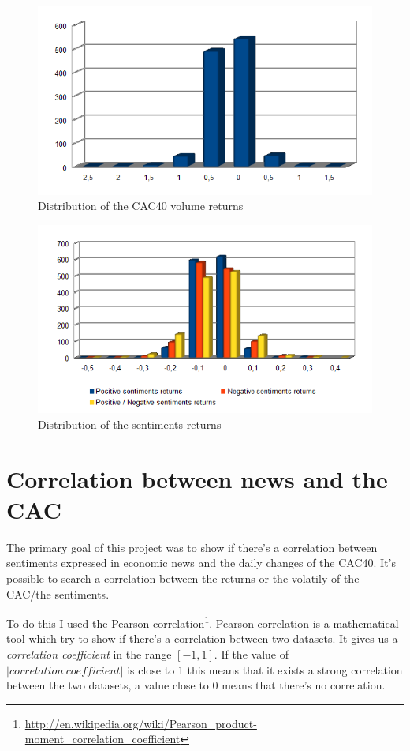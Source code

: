 \documentclass[12pt]{report}
\begin{document}
			\begin{figure}[H]
				\caption{Distribution of the CAC40 volume returns\label{dist_vol}}
				\includegraphics{plots/dists/volume_return.png}
			\end{figure}

			\begin{figure}[H]
				\caption{Distribution of the sentiments returns\label{dist_sentiments}}
				\includegraphics{plots/dists/pos_neg_posneg_returns_dist.png}
			\end{figure}
			
		\section{Correlation between news and the CAC}

			The primary goal of this project was to show if there's a correlation between sentiments expressed in economic news and the daily changes of the CAC40. It's possible to search a correlation between the returns or the volatily of the CAC/the sentiments.
			
			To do this I used the Pearson correlation\footnote{\url{http://en.wikipedia.org/wiki/Pearson_product-moment_correlation_coefficient}}. Pearson correlation is a mathematical tool which try to show if there's a correlation between two datasets. It gives us a \emph{correlation coefficient} in the range $[-1, 1]$. If the value of $|correlation\ coefficient|$ is close to 1 this means that it exists a strong correlation between the two datasets, a value close to 0 means that there's no correlation.
			
\end{document}
